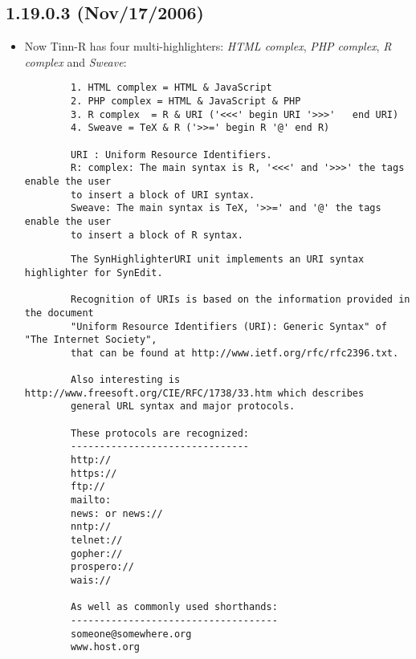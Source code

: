 \subsection*{1.19.0.3 (Nov/17/2006)}
\begin{itemize}
  \item Now Tinn-R has four multi-highlighters: \textit{HTML complex},
    \textit{PHP complex}, \textit{R complex} and \textit{Sweave}:


    \begin{footnotesize}
      \begin{verbatim}
        1. HTML complex = HTML & JavaScript
        2. PHP complex = HTML & JavaScript & PHP
        3. R complex  = R & URI ('<<<' begin URI '>>>'   end URI)
        4. Sweave = TeX & R ('>>=' begin R '@' end R)

        URI : Uniform Resource Identifiers.
        R: complex: The main syntax is R, '<<<' and '>>>' the tags enable the user
        to insert a block of URI syntax.
        Sweave: The main syntax is TeX, '>>=' and '@' the tags enable the user
        to insert a block of R syntax.
      \end{verbatim}
    \end{footnotesize}

    \begin{footnotesize}
      \begin{verbatim}
        The SynHighlighterURI unit implements an URI syntax highlighter for SynEdit.

        Recognition of URIs is based on the information provided in the document
        "Uniform Resource Identifiers (URI): Generic Syntax" of "The Internet Society",
        that can be found at http://www.ietf.org/rfc/rfc2396.txt.

        Also interesting is http://www.freesoft.org/CIE/RFC/1738/33.htm which describes
        general URL syntax and major protocols.

        These protocols are recognized:
        -------------------------------
        http://
        https://
        ftp://
        mailto:
        news: or news://
        nntp://
        telnet://
        gopher://
        prospero://
        wais://

        As well as commonly used shorthands:
        ------------------------------------
        someone@somewhere.org
        www.host.org

      \end{verbatim}
    \end{footnotesize}


\end{itemize}
